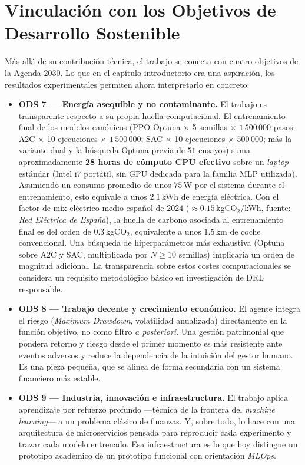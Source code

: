 \documentclass[IB,a4paper]{TFUOC}
\begin{document}
\section{Vinculación con los Objetivos de Desarrollo Sostenible}
\label{sec:conclusiones_ods}

Más allá de su contribución técnica, el trabajo se conecta con cuatro objetivos de la Agenda 2030. Lo que en el capítulo introductorio era una aspiración, los resultados experimentales permiten ahora interpretarlo en concreto:

\begin{itemize}
    \item \textbf{ODS 7 — Energía asequible y no contaminante.} El trabajo es transparente respecto a su propia huella computacional. El entrenamiento final de los modelos canónicos (PPO Optuna $\times$ 5 semillas $\times$ $1\,500\,000$ pasos; A2C $\times$ 10 ejecuciones $\times$ $1\,500\,000$; SAC $\times$ 10 ejecuciones $\times$ $500\,000$; más la variante dual y la búsqueda Optuna previa de $51$ ensayos) suma aproximadamente \textbf{28 horas de cómputo CPU efectivo} sobre un \textit{laptop} estándar (Intel i7 portátil, sin GPU dedicada para la familia MLP utilizada). Asumiendo un consumo promedio de unos $75$\,W por el sistema durante el entrenamiento, esto equivale a unos $2.1$\,kWh de energía eléctrica. Con el factor de mix eléctrico medio español de $2024$ ($\approx 0.15$\,kgCO$_2$/kWh, fuente: \textit{Red Eléctrica de España}), la huella de carbono asociada al entrenamiento final es del orden de $0.3$\,kgCO$_2$, equivalente a unos $1.5$\,km de coche convencional. Una búsqueda de hiperparámetros más exhaustiva (Optuna sobre A2C y SAC, multiplicada por $N \geq 10$ semillas) implicaría un orden de magnitud adicional. La transparencia sobre estos costes computacionales se considera un requisito metodológico básico en investigación de DRL responsable.

    \item \textbf{ODS 8 — Trabajo decente y crecimiento económico.} El agente integra el riesgo (\textit{Maximum Drawdown}, volatilidad anualizada) directamente en la función objetivo, no como filtro \textit{a posteriori}. Una gestión patrimonial que pondera retorno y riesgo desde el primer momento es más resistente ante eventos adversos y reduce la dependencia de la intuición del gestor humano. Es una pieza pequeña, que se alinea de forma secundaria con un sistema financiero más estable.

    \item \textbf{ODS 9 — Industria, innovación e infraestructura.} El trabajo aplica aprendizaje por refuerzo profundo —técnica de la frontera del \textit{machine learning}— a un problema clásico de finanzas. Y, sobre todo, lo hace con una arquitectura de microservicios pensada para reproducir cada experimento y trazar cada modelo entrenado. Esa infraestructura es lo que hoy distingue un prototipo académico de un prototipo funcional con orientación \textit{MLOps}.


\end{itemize}
\end{document}
